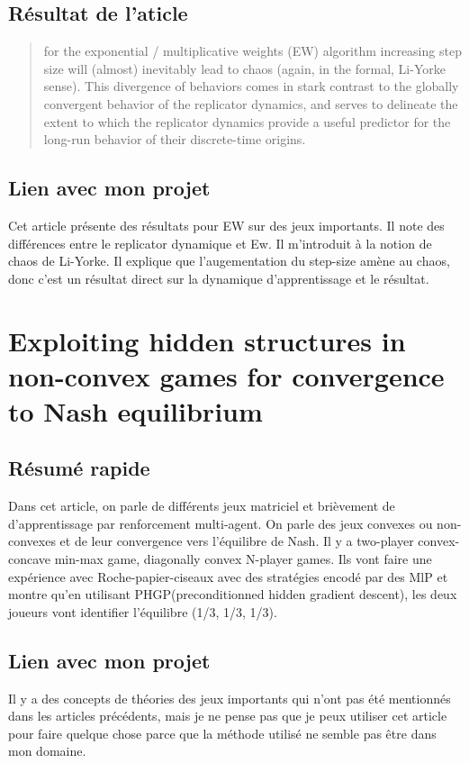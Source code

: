 \documentclass{article}
\begin{document}
\subsection{Résultat de l'aticle}
\begin{quote}
    for the exponential / multiplicative weights (EW) algorithm increasing step size will (almost) inevitably lead to chaos (again, in the formal, Li-Yorke sense). This divergence of behaviors comes in stark contrast to the globally convergent behavior of the replicator dynamics, and serves to delineate the extent to which the replicator dynamics provide a useful predictor for the long-run behavior of their discrete-time origins.
\end{quote}

\subsection{Lien avec mon projet}
Cet article présente des résultats pour EW sur des jeux importants. Il note des différences entre le replicator dynamique et Ew. Il m'introduit à la notion de chaos de Li-Yorke. Il explique que l'augementation du step-size amène au chaos, donc c'est un résultat direct sur la dynamique d'apprentissage et le résultat.


\section{Exploiting hidden structures in non-convex games for convergence to {Nash} equilibrium \cite{sakos_exploiting_2023}}

\subsection{Résumé rapide}
Dans cet article, on parle de différents jeux matriciel et brièvement de d'apprentissage par renforcement multi-agent. On parle des jeux convexes ou non-convexes et de leur convergence vers l'équilibre de Nash. Il y a two-player convex-concave min-max game, diagonally convex N-player games. Ils vont faire une expérience avec Roche-papier-ciseaux avec des stratégies encodé par des MlP et montre qu'en utilisant PHGP(preconditionned hidden gradient descent), les deux joueurs vont identifier l'équilibre (1/3, 1/3, 1/3).
\subsection{Lien avec mon projet}
Il y a des concepts de théories des jeux importants qui n'ont pas été mentionnés dans les articles précédents, mais je ne pense pas que je peux utiliser cet article pour faire quelque chose parce que la méthode utilisé ne semble pas être dans mon domaine. 
\end{document}
